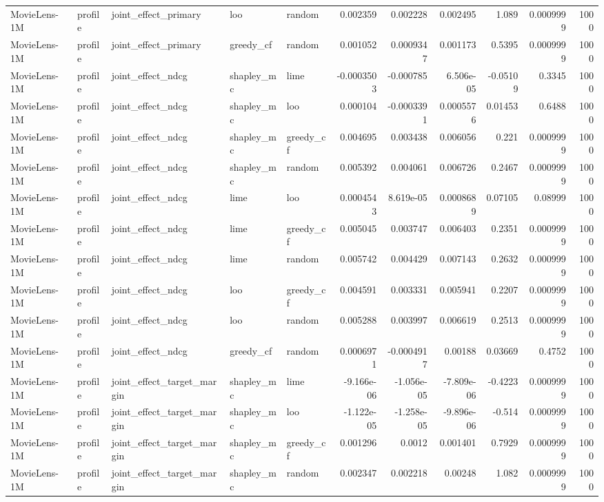 \begin{table}[t]
\begin{tabular}{lllllrrrrrr}
MovieLens-1M & profile & joint\_effect\_primary & loo & random & 0.002359 & 0.002228 & 0.002495 & 1.089 & 0.0009999 & 1000 \\
MovieLens-1M & profile & joint\_effect\_primary & greedy\_cf & random & 0.001052 & 0.0009347 & 0.001173 & 0.5395 & 0.0009999 & 1000 \\
MovieLens-1M & profile & joint\_effect\_ndcg & shapley\_mc & lime & -0.0003503 & -0.000785 & 6.506e-05 & -0.05109 & 0.3345 & 1000 \\
MovieLens-1M & profile & joint\_effect\_ndcg & shapley\_mc & loo & 0.000104 & -0.0003391 & 0.0005576 & 0.01453 & 0.6488 & 1000 \\
MovieLens-1M & profile & joint\_effect\_ndcg & shapley\_mc & greedy\_cf & 0.004695 & 0.003438 & 0.006056 & 0.221 & 0.0009999 & 1000 \\
MovieLens-1M & profile & joint\_effect\_ndcg & shapley\_mc & random & 0.005392 & 0.004061 & 0.006726 & 0.2467 & 0.0009999 & 1000 \\
MovieLens-1M & profile & joint\_effect\_ndcg & lime & loo & 0.0004543 & 8.619e-05 & 0.0008689 & 0.07105 & 0.08999 & 1000 \\
MovieLens-1M & profile & joint\_effect\_ndcg & lime & greedy\_cf & 0.005045 & 0.003747 & 0.006403 & 0.2351 & 0.0009999 & 1000 \\
MovieLens-1M & profile & joint\_effect\_ndcg & lime & random & 0.005742 & 0.004429 & 0.007143 & 0.2632 & 0.0009999 & 1000 \\
MovieLens-1M & profile & joint\_effect\_ndcg & loo & greedy\_cf & 0.004591 & 0.003331 & 0.005941 & 0.2207 & 0.0009999 & 1000 \\
MovieLens-1M & profile & joint\_effect\_ndcg & loo & random & 0.005288 & 0.003997 & 0.006619 & 0.2513 & 0.0009999 & 1000 \\
MovieLens-1M & profile & joint\_effect\_ndcg & greedy\_cf & random & 0.0006971 & -0.0004917 & 0.00188 & 0.03669 & 0.4752 & 1000 \\
MovieLens-1M & profile & joint\_effect\_target\_margin & shapley\_mc & lime & -9.166e-06 & -1.056e-05 & -7.809e-06 & -0.4223 & 0.0009999 & 1000 \\
MovieLens-1M & profile & joint\_effect\_target\_margin & shapley\_mc & loo & -1.122e-05 & -1.258e-05 & -9.896e-06 & -0.514 & 0.0009999 & 1000 \\
MovieLens-1M & profile & joint\_effect\_target\_margin & shapley\_mc & greedy\_cf & 0.001296 & 0.0012 & 0.001401 & 0.7929 & 0.0009999 & 1000 \\
MovieLens-1M & profile & joint\_effect\_target\_margin & shapley\_mc & random & 0.002347 & 0.002218 & 0.00248 & 1.082 & 0.0009999 & 1000 \\

\end{tabular}
\end{table}
